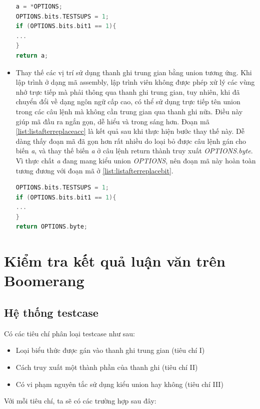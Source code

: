 \begin{itemize}
\begin{lstlisting}[caption={Mã đầu ra sau khi thực hiện bước thay thế truy xuất trực tiếp đến một phần của thanh ghi trung gian},label={list:listafterreplacebit}, language = c]
a = *OPTIONS;
OPTIONS.bits.TESTSUPS = 1;
if (OPTIONS.bits.bit1 == 1){
...
}
return a;
\end{lstlisting}
\item Thay thế các vị trí sử dụng thanh ghi trung gian bằng union tương ứng. Khi lập trình ở dạng mã assembly, lập trình viên không được phép xử lý các vùng nhớ trực tiếp mà phải thông qua thanh ghi trung gian, tuy nhiên, khi đã chuyển đổi về dạng ngôn ngữ cấp cao, có thể sử dụng trực tiếp tên union trong các câu lệnh mà không cần trung gian qua thanh ghi nữa. Điều này giúp mã đầu ra ngắn gọn, dễ hiểu và trong sáng hơn. Đoạn mã \ref{list:listafterreplaceacc} là kết quả sau khi thực hiện bước thay thế này. Dễ dàng thấy đoạn mã đã gọn hơn rất nhiều do loại bỏ được câu lệnh gán cho biến \textit{a}, và thay thế biến \textit{a} ở câu lệnh return thành truy xuất \textit{OPTIONS.byte}. Vì thực chất \textit{a} đang mang kiểu union \textit{OPTIONS}, nên đoạn mã này hoàn toàn tương đương với đoạn mã ở \ref{list:listafterreplacebit}.

\begin{lstlisting}[caption={Mã đầu ra sau khi thực hiện bước thay thế thanh ghi trung gian},label={list:listafterreplaceacc}, language = c]
OPTIONS.bits.TESTSUPS = 1;
if (OPTIONS.bits.bit1 == 1){
...
}
return OPTIONS.byte;
\end{lstlisting}
\end{itemize}


\section{Kiểm tra kết quả luận văn trên Boomerang}

\subsection{Hệ thống testcase}
Có các tiêu chí phân loại testcase như sau:
\begin{itemize}
	\item Loại biểu thức được gán vào thanh ghi trung gian (tiêu chí I)
	\item Cách truy xuất một thành phần của thanh ghi (tiêu chí II)
	\item Có vi phạm nguyên tắc sử dụng kiểu union hay không (tiêu chí III)
\end{itemize}
Với mỗi tiêu chí, ta sẽ có các trường hợp sau đây:

